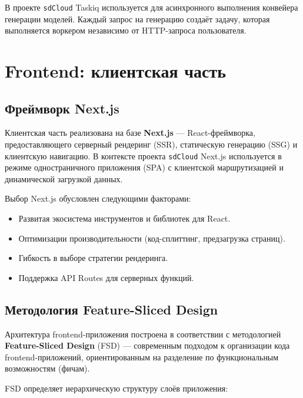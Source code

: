 В проекте \texttt{sdCloud} Taskiq используется для асинхронного выполнения конвейера генерации моделей. Каждый запрос на генерацию создаёт задачу, которая выполняется воркером независимо от HTTP-запроса пользователя.


\section{Frontend: клиентская часть}

\subsection{Фреймворк Next.js}

Клиентская часть реализована на базе \textbf{Next.js} \cite{nextjs2024} --- React-фреймворка, предоставляющего серверный рендеринг (SSR), статическую генерацию (SSG) и клиентскую навигацию. В контексте проекта \texttt{sdCloud} Next.js используется в режиме одностраничного приложения (SPA) с клиентской маршрутизацией и динамической загрузкой данных.

Выбор Next.js обусловлен следующими факторами:

\begin{itemize}
    \item Развитая экосистема инструментов и библиотек для React.
    \item Оптимизации производительности (код-сплиттинг, предзагрузка страниц).
    \item Гибкость в выборе стратегии рендеринга.
    \item Поддержка API Routes для серверных функций.
\end{itemize}

\subsection{Методология Feature-Sliced Design}

Архитектура frontend-приложения построена в соответствии с методологией \textbf{Feature-Sliced Design} (FSD) \cite{fsd2024} --- современным подходом к организации кода frontend-приложений, ориентированным на разделение по функциональным возможностям (фичам).

FSD определяет иерархическую структуру слоёв приложения:

